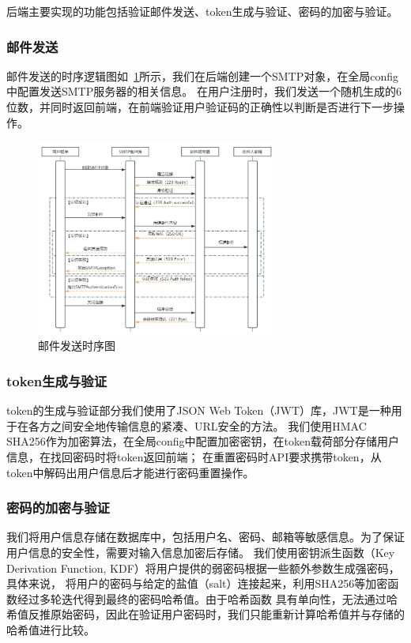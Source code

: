 后端主要实现的功能包括验证邮件发送、token生成与验证、密码的加密与验证。

\subsubsection{邮件发送}
邮件发送的时序逻辑图如~\ref{fig:SMTP-sequence}所示，我们在后端创建一个SMTP对象，在全局config中配置发送SMTP服务器的相关信息。
在用户注册时，我们发送一个随机生成的6位数，并同时返回前端，在前端验证用户验证码的正确性以判断是否进行下一步操作。

\begin{figure}[ht]
    \centering
    \includegraphics[width=0.7\textwidth]{source/img/SMTP_sequence.png}
    \caption{邮件发送时序图}
    \label{fig:SMTP-sequence}
\end{figure}

\subsubsection{token生成与验证}
token的生成与验证部分我们使用了JSON Web Token（JWT）库，JWT是一种用于在各方之间安全地传输信息的紧凑、URL安全的方法。
我们使用HMAC SHA256作为加密算法，在全局config中配置加密密钥，在token载荷部分存储用户信息，在找回密码时将token返回前端；
在重置密码时API要求携带token，从token中解码出用户信息后才能进行密码重置操作。

\subsubsection{密码的加密与验证}

我们将用户信息存储在数据库中，包括用户名、密码、邮箱等敏感信息。为了保证用户信息的安全性，需要对输入信息加密后存储。
我们使用密钥派生函数（Key Derivation Function, KDF）\cite{rfc8018}将用户提供的弱密码根据一些额外参数生成强密码，具体来说，
将用户的密码与给定的盐值（salt）连接起来，利用SHA256等加密函数经过多轮迭代得到最终的密码哈希值。由于哈希函数
具有单向性，无法通过哈希值反推原始密码，因此在验证用户密码时，我们只能重新计算哈希值并与存储的哈希值进行比较。

